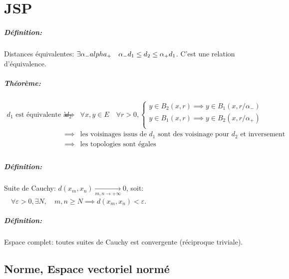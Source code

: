 \documentclass[a4paper, 11pt, french]{book}
\theoremstyle{plain} %
\theoremstyle{definition} %
\theoremstyle{remark} %
\newcommand{\1}{\mathds{1}}
\begin{document}
\chapter{JSP}

\paragraph{Définition:} Distances équivalentes: $\exists\alpha_-\\alpha_+\quad\alpha_- d_1\le d_2\le\alpha_+ d_1 $.
C'est une relation d'équivalence.

\paragraph{Théorème:}
$
	\begin{array}{rcl}
		\text{$d_1$ est équivalente à $d_2$}
		  & \implies & \forall x, y\in E\quad\forall r > 0,
		\left\{
		\begin{array}{cc}
			y\in B_2(x, r)\implies y\in B_1(x, r/\alpha_-) \\
			y\in B_1(x, r)\implies y\in B_2(x, r/\alpha_+) \\
		\end{array}
		\right.\\
		  & \implies & \text{les voisinages issus de $d_1$ sont des voisinage pour $d_2$ et inversement} \\
		  & \implies & \text{les topologies sont égales}                                                 \\
	\end{array}
$

\paragraph{Définition:} Suite de Cauchy: $ d(x_m, x_n)\underset{m, n\rightarrow +\infty}{\rightarrow} 0$,
soit: $\quad\forall\varepsilon > 0, \exists N, \quad m, n\ge N\implies d(x_m, x_n) <\varepsilon$.

\paragraph{Définition:} Espace complet: toutes suites de Cauchy est convergente (réciproque triviale).

\section{Norme, Espace vectoriel normé}
\end{document}
